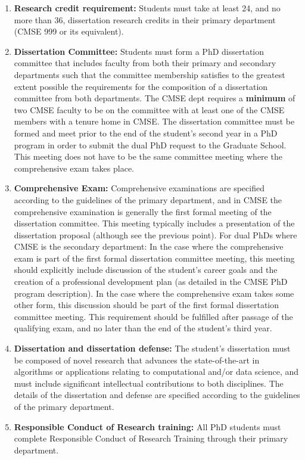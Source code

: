 \begin{enumerate}
\item \textbf{Research credit requirement:}  Students must take at
  least 24, and no more than 36, dissertation research credits in
  their primary department (CMSE 999 or its equivalent).

\item \textbf{Dissertation Committee:} Students must form a PhD
  dissertation committee that includes faculty from both their primary
  and secondary departments such that the committee membership
  satisfies to the greatest extent possible the requirements for the
  composition of a dissertation committee from both departments. The
  CMSE dept requires a \textbf{minimum} of two CMSE faculty to be on
  the committee with at least one of the CMSE members with a tenure
  home in CMSE. The dissertation committee must be formed and meet
  prior to the end of the student's second year in a PhD program in
  order to submit the dual PhD request to the Graduate School.  This
  meeting does not have to be the same committee meeting where the
  comprehensive exam takes place.

\item \textbf{Comprehensive Exam:}  Comprehensive examinations are
  specified according to the guidelines of the primary department, and
  in CMSE the comprehensive examination is generally the first formal
  meeting of the dissertation committee.  This meeting typically
  includes a 
  presentation of the dissertation proposal (although see the previous
  point).  For dual PhDs where CMSE is the secondary department: In
  the case where the comprehensive exam is part of the first formal
  dissertation committee meeting, this meeting should explicitly include
  discussion of the student's career goals and the creation of a
  professional development plan (as detailed in the CMSE PhD program
  description).  In the case where the comprehensive exam takes some
  other form, this discussion should be part of the first formal
  dissertation committee meeting.  This requirement should be fulfilled
  after passage of the qualifying exam, and no later than the end of
 the student's third year.

\item \textbf{Dissertation and dissertation defense:} The student's
  dissertation must be composed of novel research that advances the
  state-of-the-art in algorithms or applications relating to
  computational and/or data science, and must include significant
  intellectual contributions to both disciplines.  The details of the
  dissertation and defense are specified according to the guidelines
  of the primary department.

\item \textbf{Responsible Conduct of Research training:} All PhD
  students must complete Responsible Conduct of Research Training
  through their primary department.

\end{enumerate}

